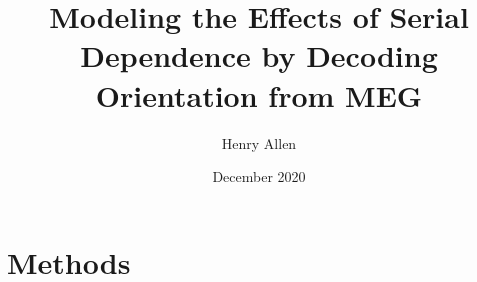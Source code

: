 \documentclass[a4paper,man]{apa6}
\begin{document}
\title{Modeling the Effects of Serial Dependence by Decoding Orientation from MEG}
\author{Henry Allen }
\date{December 2020}

%  

\maketitle

%

\section{Methods}


%

%


\end{document}
